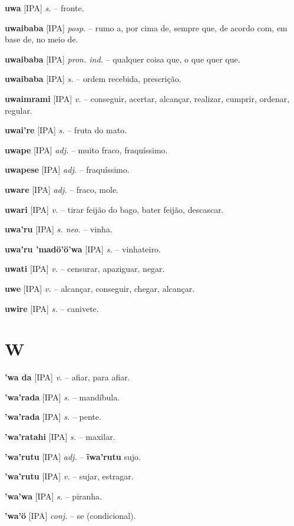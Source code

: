\textbf{uwa} [IPA] \textit{s.} -- fronte.

\textbf{uwaibaba} [IPA] \textit{posp.} -- rumo a, por cima de, sempre que, de acordo com, em base de, no meio de.

\textbf{uwaibaba} [IPA] \textit{pron. ind.} -- qualquer coisa que, o que quer que.

\textbf{uwaibaba} [IPA] \textit{s.} -- ordem recebida, prescrição.

\textbf{uwaimrami} [IPA] \textit{v.} -- conseguir, acertar, alcançar, realizar, cumprir, ordenar, regular.

\textbf{uwai're} [IPA] \textit{s.} -- fruta do mato.

\textbf{uwape} [IPA] \textit{adj.} -- muito fraco, fraquíssimo.

\textbf{uwapese} [IPA] \textit{adj.} -- fraquíssimo.

\textbf{uware} [IPA] \textit{adj.} -- fraco, mole.

\textbf{uwari} [IPA] \textit{v.} -- tirar feijão do bago, bater feijão, descascar.

\textbf{uwa'ru} [IPA] \textit{s. neo.} -- vinha.

\textbf{uwa'ru 'madö'ö'wa} [IPA] \textit{s.} -- vinhateiro.

\textbf{uwati} [IPA] \textit{v.} -- censurar, apaziguar, negar.

\textbf{uwe} [IPA] \textit{v.} -- alcançar, conseguir, chegar, alcançar.

\textbf{uwire} [IPA] \textit{s.} -- canivete.


\section*{W}


\textbf{'wa da} [IPA] \textit{v.} -- afiar, para afiar.

\textbf{'wa'rada} [IPA] \textit{s.} -- mandíbula.

\textbf{'wa'rada} [IPA] \textit{s.} -- pente.

\textbf{'wa'ratahi} [IPA] \textit{s.} -- maxilar.

\textbf{'wa'rutu} [IPA] \textit{adj.} -- \textbf{ĩwa'rutu} sujo.

\textbf{'wa'rutu} [IPA] \textit{v.} -- sujar, estragar.

\textbf{'wa'wa} [IPA] \textit{s.} -- piranha.

\textbf{'wa'ö} [IPA] \textit{conj.} -- se (condicional).

